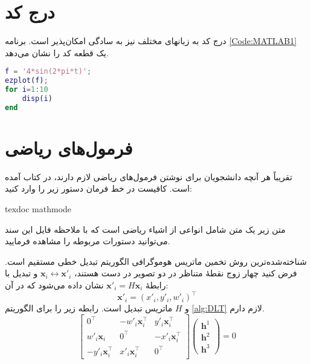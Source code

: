 \section{درج کد}
درج کد به زبانهای مختلف نیز به سادگی امکان‌پذیر است. برنامه 
\ref{Code:MATLAB1}
یک قطعه کد  را نشان می‌دهد.
\begin{lstlisting}[language=MATLAB,breaklines=true,numbers=right, numberstyle=\footnotesize, numbersep=-10pt,  frame=single, breakatwhitespace=false,
caption={نمونه کد \lr{MATLAB}},label={Code:MATLAB1}]
% define a continuous function
f = '4*sin(2*pi*t)';
ezplot(f);
for i=1:10
    disp(i)
end
\end{lstlisting}




\section{فرمول‌های ریاضی}
تقریباً هر آنچه دانشجویان برای نوشتن فرمول‌های ریاضی لازم دارند، در کتاب 
آمده است. کافیست در خط فرمان دستور زیر را وارد کنید:
\begin{latin}
texdoc mathmode
\end{latin}
متن زیر یک متن شامل انواعی از اشیاء ریاضی است که با ملاحظه فایل  این سند می‌توانید دستورات مربوطه را مشاهده فرمایید.

شناخته‌شده‌ترین روش تخمین ماتریس هوموگرافی الگوریتم تبدیل خطی مستقیم 
است.  فرض کنید چهار زوج نقطهٔ متناظر در دو تصویر در دست هستند،  $\mathbf{x}_i\leftrightarrow\mathbf{x}'_i$   و تبدیل با رابطهٔ
  $\mathbf{x}'_i = H\mathbf{x}_i$
  نشان داده می‌شود که در آن:
\[\mathbf{x}'_i=(x'_i,y'_i,w'_i)^\top  \]
و $H$ ماتریس تبدیل است.
رابطه زیر را برای الگوریتم  \eqref{alg:DLT} لازم دارم.
\begin{equation}\label{eq:DLT_Ah}
\left[
\begin{array}{ccc}
0^\top & -w'_i\mathbf{x}_i^\top & y'_i\mathbf{x}_i^\top \\ 
w'_i\mathbf{x}_i & 0^\top & -x'_i\mathbf{x}_i^\top \\ 
- y'_i\mathbf{x}_i^\top & x'_i\mathbf{x}_i^\top & 0^\top
\end{array} 
\right]
\left(
\begin{array}{c}
\mathbf{h}^1 \\ 
\mathbf{h}^2 \\ 
\mathbf{h}^3
\end{array} 
\right)=0
\end{equation}

